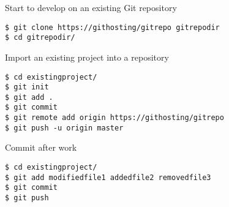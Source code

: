 \begin{frame}[c,fragile]{Start to develop on an existing Git repository}

\begin{center}
\begin{minipage}{\textwidth}

\begin{listing}[H]
\begin{verbatim}
$ git clone https://githosting/gitrepo gitrepodir
$ cd gitrepodir/
\end{verbatim}
\end{listing}

\end{minipage}
\end{center}

\end{frame}


\begin{frame}[c,fragile]{Import an existing project into a repository}

\begin{center}
\begin{minipage}{\textwidth}

\begin{listing}[H]
\begin{verbatim}
$ cd existingproject/
$ git init
$ git add .
$ git commit
$ git remote add origin https://githosting/gitrepo
$ git push -u origin master
\end{verbatim}
\end{listing}

\end{minipage}
\end{center}

\end{frame}


\begin{frame}[c,fragile]{Commit after work}

\begin{center}
\begin{minipage}{\textwidth}

\begin{listing}[H]
\begin{verbatim}
$ cd existingproject/
$ git add modifiedfile1 addedfile2 removedfile3
$ git commit
$ git push
\end{verbatim}
\end{listing}

\end{minipage}
\end{center}

\end{frame}
